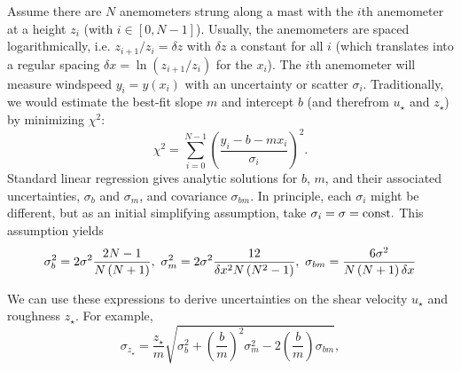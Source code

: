 \documentclass[linenumbers]{aastex631}
\begin{document}
Assume there are $N$ anemometers strung along a mast with the $i$th anemometer at a height $z_i$ (with $i \in [0, N-1]$). Usually, the anemometers are spaced logarithmically, i.e. $z_{i+1}/z_i = \delta z$ with $\delta z$ a constant for all $i$ (which translates into a regular spacing $\delta x = \ln(z_{i+1}/z_i)$ for the $x_i$). The $i$th anemometer will measure windspeed $y_i = y(x_i)$ with an uncertainty or scatter $\sigma_i$. Traditionally, we would estimate the best-fit slope $m$ and intercept $b$ (and therefrom $u_\star$ and $z_\star$) by minimizing $\chi^2$:
\begin{equation}
    \chi^2 = \sum_{i=0}^{N-1} \left( \frac{y_i - b - m x_i}{\sigma_i} \right)^2.\label{eqn:chisq}
\end{equation}
Standard linear regression gives analytic solutions for $b$, $m$, and their associated uncertainties, $\sigma_b$ and $\sigma_m$, and covariance $\sigma_{bm}$. In principle, each $\sigma_i$ might be different, but as an initial simplifying assumption, take $\sigma_i = \sigma = {\rm const.}$ This assumption yields
\begin{equation}
    \sigma_b^2 = 2\sigma^2 \frac{2N - 1}{N\left(N + 1\right)},\ 
    \sigma_m^2 = 2\sigma^2 \frac{12}{\delta x^2 N \left( N^2 - 1 \right)},\ 
    \sigma_{bm} = \frac{6 \sigma^2}{N \left( N + 1\right) \delta x \label{eqn:sigma_b-and-sigma_m} }\\
\end{equation}

We can use these expressions to derive uncertainties on the shear velocity $u_\star$ and roughness $z_\star$. For example, 
\begin{equation}
\sigma_{z_\star} = \frac{z_\star}{m} \sqrt{ \sigma_b^2 + \left( \frac{b}{m} \right)^2 \sigma_m^2 - 2 \left( \frac{b}{m} \right) \sigma_{b m}},
\end{equation}

{}



\end{document}
